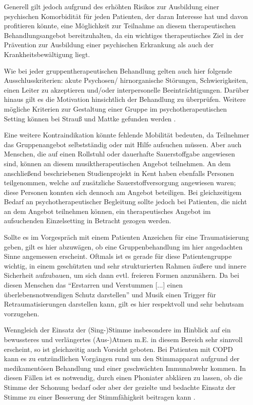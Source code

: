 Generell gilt jedoch aufgrund des erhöhten Risikos zur Ausbildung einer psychischen Komorbidität für jeden Patienten, der daran Interesse hat und davon profitieren könnte, eine Möglichkeit zur Teilnahme an diesem therapeutischen Behandlungsangebot bereitzuhalten, da ein wichtiges therapeutisches Ziel in der Prävention zur Ausbildung einer psychischen Erkrankung als auch der Krankheitsbewältigung liegt.

Wie bei jeder gruppentherapeutischen Behandlung gelten auch hier folgende Ausschlusskriterien: akute Psychosen/ hirnorganische Störungen, Schwierigkeiten, einen Leiter zu akzeptieren und/oder interpersonelle Beeinträchtigungen. Darüber hinaus gilt es die Motivation hinsichtlich der Behandlung zu überprüfen. Weitere mögliche Kriterien zur Gestaltung einer Gruppe im psychotherapeutischen Setting können bei Strauß und Mattke gefunden werden \autocite[vgl.][78-88]{mattke2007}.

Eine weitere Kontraindikation könnte fehlende Mobilität bedeuten, da Teilnehmer das Gruppenangebot selbstständig oder mit Hilfe aufsuchen müssen. Aber auch Menschen, die auf einen Rollstuhl oder dauerhafte Sauerstoffgabe angewiesen sind, können an diesem musiktherapeutischen Angebot teilnehmen. An dem anschließend beschriebenen Studienprojekt in Kent haben ebenfalls Personen teilgenommen, welche auf zusätzliche Sauerstoffversorgung angewiesen waren; diese Personen konnten sich dennoch am Angebot beteiligen. Bei gleichzeitigem Bedarf an psychotherapeutischer Begleitung sollte jedoch bei Patienten, die nicht an dem Angebot teilnehmen können, ein therapeutisches Angebot im aufsuchenden Einzelsetting in Betracht gezogen werden.

Sollte es im Vorgespräch mit einem Patienten Anzeichen für eine Traumatisierung geben, gilt es hier abzuwägen, ob eine Gruppenbehandlung im hier angedachten Sinne angemessen erscheint. Oftmals ist es gerade für diese Patientengruppe wichtig, in einem geschützten und sehr strukturierten Rahmen äußere und innere Sicherheit aufzubauen, um sich dann evtl. freieren Formen anzunähern. Da bei diesen Menschen das "`Erstarren und Verstummen [...] einen überlebensnotwendigen Schutz darstellen"' \autocite[68]{rittner2012} und Musik einen Trigger für Retraumatisierungen darstellen kann, gilt es hier respektvoll und sehr behutsam vorzugehen.

Wenngleich der Einsatz der (Sing-)Stimme insbesondere im Hinblick auf ein bewussteres und verlängertes (Aus-)Atmen m.E. in diesem Bereich sehr sinnvoll erscheint, so ist gleichzeitig auch Vorsicht geboten. Bei Patienten mit COPD kann es zu entzündlichen Vorgängen rund um den Stimmapparat aufgrund der medikamentösen Behandlung und einer geschwächten Immunabwehr kommen. In diesen Fällen ist es notwendig, durch einen Phoniater abklären zu lassen, ob die Stimme der Schonung bedarf oder aber der gezielte und bedachte Einsatz der Stimme zu einer Besserung der Stimmfähigkeit beitragen kann \autocite[vgl.][103ff.]{alavi2009}.


